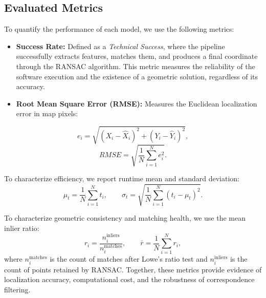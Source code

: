 \subsection{Evaluated Metrics}
To quantify the performance of each model, we use the following metrics:

\begin{itemize}
    \item \textbf{Success Rate:} Defined as a \textit{Technical Success}, where the pipeline successfully extracts features, matches them, and produces a final coordinate through the RANSAC algorithm. This metric measures the reliability of the software execution and the existence of a geometric solution, regardless of its accuracy.
    \item \textbf{Root Mean Square Error (RMSE):} Measures the Euclidean localization error in map pixels:
\end{itemize}

\begin{equation}
e_i = \sqrt{(X_i - \hat{X}_i)^2 + (Y_i - \hat{Y}_i)^2},
\end{equation}
\begin{equation}
RMSE = \sqrt{\frac{1}{N}\sum_{i=1}^{N} e_i^2}.
\end{equation}

To characterize efficiency, we report runtime mean and standard deviation:
\begin{equation}
\mu_t = \frac{1}{N}\sum_{i=1}^{N} t_i, \qquad
\sigma_t = \sqrt{\frac{1}{N}\sum_{i=1}^{N}(t_i - \mu_t)^2}.
\end{equation}

To characterize geometric consistency and matching health, we use the mean inlier ratio:
\begin{equation}
r_i = \frac{n_i^{\text{inliers}}}{n_i^{\text{matches}}}, \qquad
\bar{r} = \frac{1}{N}\sum_{i=1}^{N} r_i,
\end{equation}
where $n_i^{\text{matches}}$ is the count of matches after Lowe's ratio test and $n_i^{\text{inliers}}$ is the count of points retained by RANSAC. Together, these metrics provide evidence of localization accuracy, computational cost, and the robustness of correspondence filtering.

